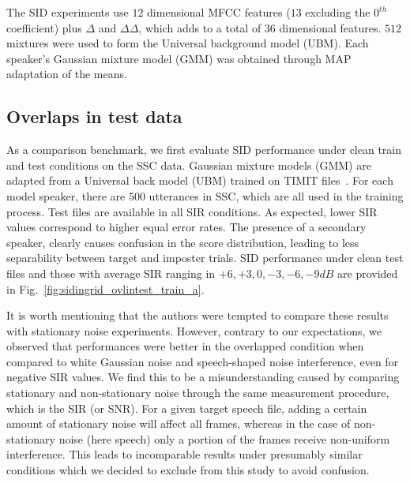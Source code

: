 {The SID experiments use $12$ dimensional MFCC features ($13$ excluding the $0^{th}$ coefficient) plus $\Delta$ and $\Delta\Delta$, which adds to a total of 36 dimensional features. $512$ mixtures were used to form the Universal background model (UBM). Each speaker's Gaussian mixture model (GMM) was obtained through MAP adaptation of the means. 

\subsection{Overlaps in test data}
As a comparison benchmark, we first evaluate SID performance under clean train and test conditions on the SSC data. 
Gaussian mixture models (GMM) are adapted from a Universal back model (UBM) trained on TIMIT files~\cite{msridentity}. 
For each model speaker, there are 500 utterances in SSC, which are all used in the training process. Test files are available in all SIR conditions. 
As expected, lower SIR values correspond to higher equal error rates. 
The presence of a secondary speaker, clearly causes confusion in the score distribution, leading to less separability between target and imposter trials. 
SID performance under clean test files and those with average SIR ranging in $+6, +3, 0, -3, -6, -9 dB$ are provided in Fig.~\ref{fig:sidingrid_ovlintest_train_a}. 

It is worth mentioning that the authors were tempted to compare these results with stationary noise experiments. 
However, contrary to our expectations, we observed that performances were better in the overlapped condition when compared to white Gaussian noise and speech-shaped noise interference, even for negative SIR values. 
We find this to be a misunderstanding caused by comparing stationary and non-stationary noise through the same measurement procedure, which is the SIR (or SNR). 
For a given target speech file, adding a certain amount of stationary noise will affect all frames, whereas in the case of non-stationary noise (here speech) only a portion of the frames receive non-uniform interference. 
This leads to incomparable results under presumably similar conditions which we decided to exclude from this study to avoid confusion. 

}
